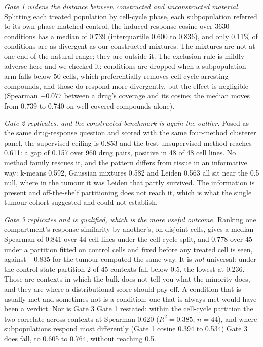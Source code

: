 \documentclass[11pt,letterpaper]{article}
\newcommand{\TAHOECONDS}{3630}
\newcommand{\TAHOEGONE}{0.739}
\newcommand{\TAHOEGONEQ}{0.600 to 0.836}
\newcommand{\TAHOEBELOWMIX}{0.11}
\newcommand{\TAHOEGTWOCEIL}{0.853}
\newcommand{\TAHOEGTWOUNSUP}{0.611}
\newcommand{\TAHOEGTWOGAP}{0.157}
\newcommand{\TAHOEGTWOPAIRS}{960}
\newcommand{\TAHOEGTWOLINES}{48}
\newcommand{\TAHOEGTWOLINESPOS}{48}
\newcommand{\TAHOEKMEANS}{0.592}
\newcommand{\TAHOEGMM}{0.582}
\newcommand{\TAHOELEIDEN}{0.563}
\newcommand{\TAHOEGTHREECC}{0.841}
\newcommand{\TAHOEGTHREECCN}{44}
\newcommand{\TAHOEGTHREEST}{0.778}
\newcommand{\TAHOEGTHREESTN}{45}
\newcommand{\TAHOEGTHREESTOPEN}{2}
\newcommand{\TAHOEGTHREESTMIN}{0.236}
\newcommand{\TAHOECOUPLING}{0.620}
\newcommand{\TAHOECOUPLINGRSQ}{0.385}
\newcommand{\TAHOECOUPLINGN}{44}
\newcommand{\TAHOEOPENGONE}{0.394 to 0.534}
\newcommand{\TAHOEOPENGTHREE}{0.605 to 0.764}
\newcommand{\PREMISEDISJOINT}{+0.835}
\begin{document}
\emph{Gate 1 widens the distance between constructed and unconstructed material.} Splitting each
treated population by cell-cycle phase, each subpopulation referred to its own phase-matched
control, the induced response cosine over \TAHOECONDS{} conditions has a median of \TAHOEGONE{}
(interquartile \TAHOEGONEQ{}), and only \TAHOEBELOWMIX{}\% of conditions are as divergent as our
constructed mixtures. The mixtures are not at one end of the natural range; they are outside it.
The exclusion rule is mildly adverse here and we checked it: conditions are dropped when a
subpopulation arm falls below 50 cells, which preferentially removes cell-cycle-arresting
compounds, and those do respond more divergently, but the effect is negligible (Spearman $+0.077$
between a drug's coverage and its cosine; the median moves from \TAHOEGONE{} to 0.740 on
well-covered compounds alone).

\emph{Gate 2 replicates, and the constructed benchmark is again the outlier.} Posed as the same
drug-response question and scored with the same four-method clusterer panel, the supervised
ceiling is \TAHOEGTWOCEIL{} and the best unsupervised method reaches \TAHOEGTWOUNSUP{}: a gap of
\TAHOEGTWOGAP{} over \TAHOEGTWOPAIRS{} drug pairs, positive in \TAHOEGTWOLINESPOS{} of
\TAHOEGTWOLINES{} cell lines. No method family rescues it, and the pattern differs from tissue in
an informative way: k-means \TAHOEKMEANS{}, Gaussian mixtures \TAHOEGMM{} and Leiden
\TAHOELEIDEN{} all sit near the 0.5 null, where in the tumour it was Leiden that partly survived.
The information is present and off-the-shelf partitioning does not reach it, which is what the
single tumour cohort suggested and could not establish.

\emph{Gate 3 replicates and is qualified, which is the more useful outcome.} Ranking one
compartment's response similarity by another's, on disjoint cells, gives a median Spearman of
\TAHOEGTHREECC{} over \TAHOEGTHREECCN{} cell lines under the cell-cycle split, and
\TAHOEGTHREEST{} over \TAHOEGTHREESTN{} under a partition fitted on control cells and fixed before
any treated cell is seen, against \PREMISEDISJOINT{} for the tumour computed the same way. It is
\emph{not} universal: under the control-state partition \TAHOEGTHREESTOPEN{} of
\TAHOEGTHREESTN{} contexts fall below 0.5, the lowest at \TAHOEGTHREESTMIN{}. Those are contexts
in which the bulk does not tell you what the minority does, and they are where a distributional
score should pay off. A condition that is usually met and sometimes not is a condition; one that
is always met would have been a verdict. Nor is Gate 3 Gate 1 restated: within the cell-cycle
partition the two correlate across contexts at Spearman \TAHOECOUPLING{}
($R^2 = \TAHOECOUPLINGRSQ{}$, $n = \TAHOECOUPLINGN{}$), and where subpopulations respond most
differently (Gate 1 cosine \TAHOEOPENGONE{}) Gate 3 does fall, to \TAHOEOPENGTHREE{}, without
reaching 0.5.
\end{document}

